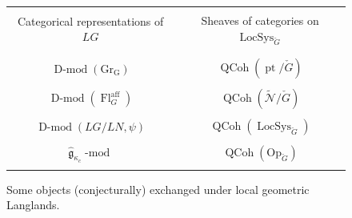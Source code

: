 \documentclass[10pt]{amsart}
\newcommand{\Op}{\mathrm{Op}_{\cG}}
\newcommand{\gkc}{\gk_{\kappa_c}}
\newcommand{\LS}{\on{LocSys}_{\cG}}
\newcommand{\fg}{\mathfrak{g}}
\newcommand{\on}{\operatorname}
\renewcommand{\mod}{\on{-mod}}
\newcommand{\Dmod}{\on{D-mod}}
\theoremstyle{remark}
\newcommand{\sN}{\mathscr{N}}
\newcommand{\Fl}{\operatorname{Fl}}
\newcommand{\gk}{\widehat{\fg}}
\numberwithin{equation}{section}
\newcommand{\cG}{\check{G}}
\renewcommand{\mod}{\operatorname{-mod}}
\newcommand{\QCoh}{\on{QCoh}}
\begin{document}
	\begin{center}
		\begin{figure}
			
			
			
			
			\begin{tabular}{|c|c|} 
				
				\hline &
				

\\
			 \hspace{1cm}Categorical representations of $LG$  \hspace{1cm} 
				& 
				  \hspace{1cm}Sheaves of categories on $\LS$  \hspace{1cm} 
				\\  & \\  
				\hline &
				\\ 
	$\hspace{0cm} \Dmod(\on{Gr_G})$ 	& 
				$ \on{QCoh}( \on{pt}/\cG)$  
				\\ & \\ [2mm] 
				$\hspace{0cm}\Dmod(\Fl^{\on{aff}}_G)$ 	& $\hspace{0cm} \QCoh( 
				\widetilde{{\sN}}/\cG)$  \\ & \\ [2mm] 
				$\hspace{0cm}\Dmod(LG/LN, \psi) $	& $\hspace{0cm} 
				\QCoh(\LS)$  
				\\ & \\ [2mm] 
				$\hspace{0cm}\gkc\mod $	& $\hspace{0cm} \QCoh(\Op)$  \\  &
				\\ 
			\hline	
			\end{tabular}
			\caption{Some objects (conjecturally) exchanged under local 
			geometric Langlands.}
			
			\label{f:table}
		\end{figure}
	\end{center}
	
	
\end{document}
